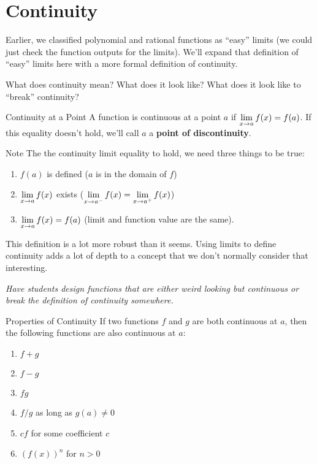 \section{Continuity}

Earlier, we classified polynomial and rational functions as ``easy'' limits (we could just check the function outputs for the limits).
We'll expand that definition of ``easy'' limits here with a more formal definition of continuity.

What does continuity mean? What does it look like? What does it look like to ``break'' continuity?

\begin{defn}{Continuity at a Point}
  A function is continuous at a point $a$ if $\displaystyle \lim_{x\to a}f(x) = f(a)$.
  If this equality doesn't hold, we'll call $a$ a \textbf{point of discontinuity}.
\end{defn}

\begin{note}{Note}
  The the continuity limit equality to hold, we need three things to be true:
  \begin{enumerate}
    \item $f(a)$ is defined ($a$ is in the domain of $f$)
    \item $\displaystyle \lim_{x\to a}f(x)$ exists ($\displaystyle \lim_{x\to a^-} f(x) = \displaystyle \lim_{x\to a^+} f(x)$)
    \item $\displaystyle \lim_{x\to a}f(x) = f(a)$ (limit and function value are the same).
  \end{enumerate}
\end{note}

This definition is a lot more robust than it seems.
Using limits to define continuity adds a lot of depth to a concept that we don't normally consider that interesting.

\textit{Have students design functions that are either weird looking but continuous or break the definition of continuity somewhere.}

\begin{thm}{Properties of Continuity}
  If two functions $f$ and $g$ are both continuous at $a$, then the following functions are also continuous at $a$:
    \begin{enumerate}
      \item $f+g$
      \item $f-g$
      \item $fg$
      \item $f/g$ as long as $g(a)\neq 0$
      \item $cf$ for some coefficient $c$
      \item $(f(x))^n$ for $n>0$
    \end{enumerate}
\end{thm}

